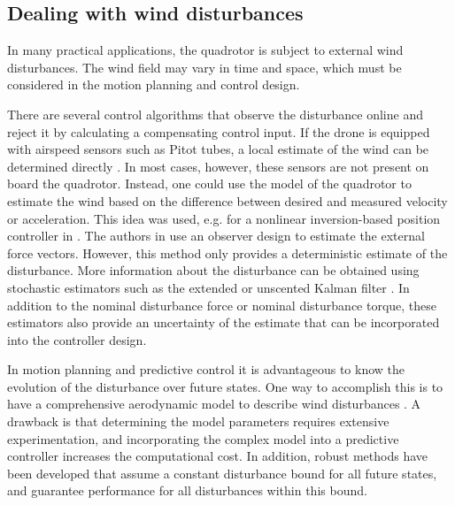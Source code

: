 
\subsection{Dealing with wind disturbances}

In many practical applications, the quadrotor is subject to external wind disturbances. The wind field may vary in time and space, which must be considered in the motion planning and control design. 

There are several control algorithms that observe the disturbance online and reject it by calculating a compensating control input. If the drone is equipped with airspeed sensors such as Pitot tubes, a local estimate of the wind can be determined directly \cite{sydney2013dynamic}. In most cases, however, these sensors are not present on board the quadrotor. Instead, one could use the model of the quadrotor to estimate the wind based on the difference between desired and measured velocity or acceleration. This idea was used, e.g. for a nonlinear inversion-based position controller in \cite{smeur2018cascaded}. The authors in \cite{tomic2014unified} use an observer design to estimate the external force vectors. However, this method only provides a deterministic estimate of the disturbance. More information about the disturbance can be obtained using stochastic estimators such as the extended or unscented Kalman filter \cite{hentzen2019disturbance}. In addition to the nominal disturbance force or nominal disturbance torque, these estimators also provide an uncertainty of the estimate that can be incorporated into the controller design. 

In motion planning and predictive control it is advantageous to know the evolution of the disturbance over future states. One way to accomplish this is to have a comprehensive aerodynamic model to describe wind disturbances \cite{waslander2009wind}. A drawback is that determining the model parameters requires extensive experimentation, and incorporating the complex model into a predictive controller increases the computational cost. In addition, robust methods have been developed \cite{ton2012robust} that assume a constant disturbance bound for all future states, and guarantee performance for all disturbances within this bound. 

